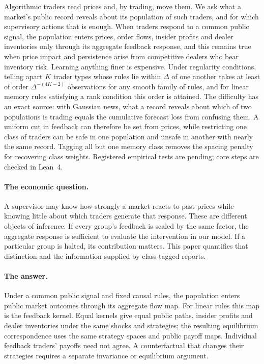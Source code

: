 \noindent Algorithmic traders read prices and, by trading, move them. We ask what a market's public record reveals about its population of such traders, and for which supervisory actions that is enough. When traders respond to a common public signal, the population enters prices, order flows, insider profits and dealer inventories only through its aggregate feedback response, and this remains true when price impact and persistence arise from competitive dealers who bear inventory risk. Learning anything finer is expensive. Under regularity conditions, telling apart $K$ trader types whose rules lie within $\Delta$ of one another takes at least of order $\Delta^{-(4K-2)}$ observations for any smooth family of rules, and for linear memory rules satisfying a rank condition this order is attained. The difficulty has an exact source: with Gaussian news, what a record reveals about which of two populations is trading equals the cumulative forecast loss from confusing them. A uniform cut in feedback can therefore be set from prices, while restricting one class of traders can be safe in one population and unsafe in another with nearly the same record. Tagging all but one memory class removes the spacing penalty for recovering class weights. Registered empirical tests are pending; core steps are checked in Lean~4.

\paragraph{The economic question.} A supervisor may know how strongly a market reacts to past prices while knowing little about which traders generate that response. These are different objects of inference. If every group's feedback is scaled by the same factor, the aggregate response is sufficient to evaluate the intervention in our model. If a particular group is halted, its contribution matters. This paper quantifies that distinction and the information supplied by class-tagged reports.

\paragraph{The answer.} Under a common public signal and fixed causal rules, the population enters public market outcomes through its aggregate flow map. For linear rules this map is the feedback kernel. Equal kernels give equal public paths, insider profits and dealer inventories under the same shocks and strategies; the resulting equilibrium correspondence uses the same strategy spaces and public payoff maps. Individual feedback traders' payoffs need not agree. A counterfactual that changes their strategies requires a separate invariance or equilibrium argument.

